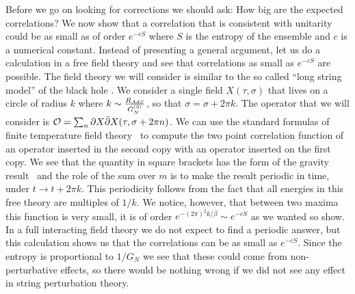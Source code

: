 Before we go on looking  for corrections we should ask:
How big are the expected correlations?
We now show that a correlation that is consistent with unitarity could
be as small as of order $e^{- c S}$ where $S$ is the entropy of the 
ensemble and $c$ is a numerical constant. Instead of presenting 
a general argument, let us do a 
calculation in a free field theory and see that 
correlations as small as $e^{-c S}$ are possible. 
The field theory we will consider is similar to 
 the so called ``long string model''
of the black hole \mss . We consider a single field $X(\tau, \sigma)$ 
that lives 
on a circle of radius  $ k$ where $k \sim 
{ R_{AdS} \over G_N^{(3)} } $, so that $\sigma = \sigma + 2 \pi k $.
The operator that we will consider is 
$ {\cal O} = \sum_n  \partial X \bar \partial X (\tau, \sigma + 2 \pi n)$.
We can use the standard formulas of finite temperature field theory \msh\
to compute the two point correlation function of an operator inserted
in the second copy with an operator inserted on the first copy. 
\eqn{}
We see that the quantity in square brackets has the form of the
gravity result \other\ and the role of the sum over $m$ is to 
make the result periodic in time, under $t \to t + 2 \pi k$. 
This periodicity follows from the fact that 
all energies in this free 
theory are multiples of $1/k$. We notice, however, that between two
maxima this function is very small, it is of order 
$e^{ -  (2 \pi)^2 k/\beta } \sim e^{ - c S}$ as we wanted so show. 
In a full interacting field theory we do not expect to find a periodic
answer, but this  calculation shows us that the correlations
can be as small as $e^{- c S}$. Since the entropy is proportional to
$1/G_N$ we see that these could come from non-perturbative effects, so
there would be nothing wrong if we did not see any effect 
 in string perturbation
theory. 

